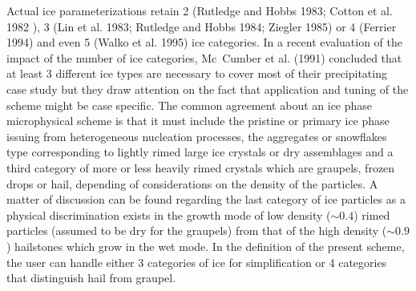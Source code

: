 Actual ice parameterizations retain 2 (Rutledge and Hobbs 1983; Cotton et al.
1982\footnotemark
{}
), 3 (Lin et al. 1983; Rutledge and Hobbs 1984; Ziegler 1985) or 4
(Ferrier 1994) and even 5 (Walko et al. 1995) ice categories. In a recent
evaluation of the impact of the number of ice categories, Mc~Cumber et al.
(1991) concluded that at least 3 different ice types are necessary to cover most
of their precipitating case study but they
draw attention on the fact that application and tuning of the scheme might be
case specific. The common agreement about an ice phase microphysical scheme is
that it must include the pristine or primary ice phase issuing from
heterogeneous nucleation processes, the aggregates or snowflakes type
corresponding to lightly rimed large ice crystals or dry assemblages
and a third category of more or less heavily rimed crystals which are
graupels, frozen drops or hail, depending of considerations on the density of
the particles. A matter of discussion can be found regarding the last category
of ice particles as a physical discrimination exists in the growth mode of
low density ($\sim 0.4$) rimed particles (assumed to be dry for the graupels)
from that of the high density ($\sim 0.9$) hailstones which grow in the wet
mode. In the definition of the present scheme, the user can handle either 3 categories of ice for simplification or 4 categories that distinguish hail from graupel.


